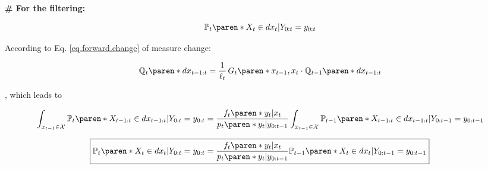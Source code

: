\textbf{\# For the filtering:}

\begin{equation*}
    \mathbb{P}_{t} \paren*{ X_{t} \in dx_{t} \vert Y_{0:t} = y_{0:t}}
\end{equation*}

According to Eq. \eqref{eq.forward.change} of measure change:

\begin{equation*}
    \mathbb{Q}_{t} \paren*{dx_{t-1:t}} =
        \dfrac{1}{\ell_{t}} \,
        G_{t} \paren*{x_{t-1}, x_{t}} \cdot
        \mathbb{Q}_{t-1} \paren*{dx_{t-1:t}}
\end{equation*}

, which leads to

\begin{align*}
\int_{x_{t-1} \in \mathcal{X}} \mathbb{P}_{t}
    \paren*{ X_{t-1:t} \in dx_{t-1:t} \vert Y_{0:t} = y_{0:t}}
&=
    \dfrac{
        f_{t} \paren*{ y_{t} \vert x_{t} }
    }{
        p_{t} \paren*{ y_{t} \vert y_{0:t-1} }
    }
    \int_{x_{t-1} \in \mathcal{X}} \mathbb{P}_{t-1}
        \paren*{ X_{t-1:t} \in dx_{t-1:t} \vert Y_{0:t-1} = y_{0:t-1}}
\\[1.5ex]
\Aboxed{
    \mathbb{P}_{t} \paren*{ X_{t} \in dx_{t} \vert Y_{0:t} = y_{0:t}}
    &=
        \dfrac{
            f_{t} \paren*{ y_{t} \vert x_{t} }
        }{
            p_{t} \paren*{ y_{t} \vert y_{0:t-1} }
        }
        \mathbb{P}_{t-1} \paren*{ X_{t} \in dx_{t} \vert Y_{0:t-1} = y_{0:t-1}}
}
\end{align*}